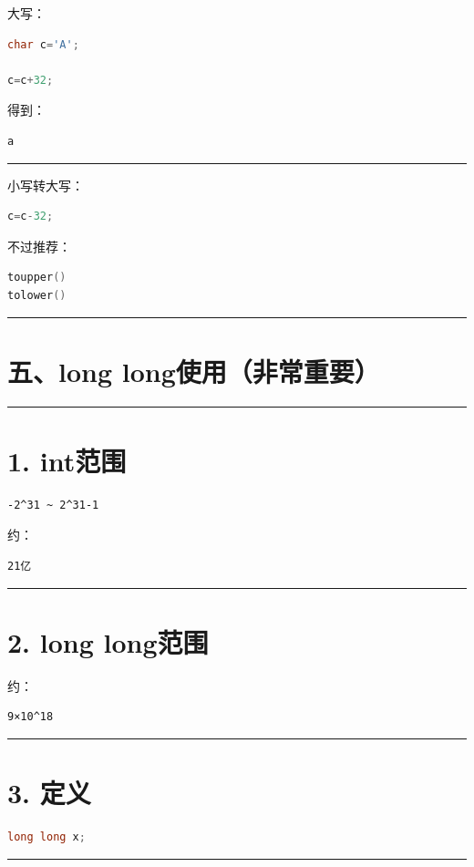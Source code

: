 \documentclass[9pt,twocolumn]{extarticle}
\begin{document}
大写：
\begin{lstlisting}[language=C++]
char c='A';

c=c+32;
\end{lstlisting}
得到：
\begin{lstlisting}
a
\end{lstlisting}

\noindent\rule{\linewidth}{0.4pt}

小写转大写：
\begin{lstlisting}[language=C++]
c=c-32;
\end{lstlisting}
不过推荐：
\begin{lstlisting}[language=C++]
toupper()
tolower()
\end{lstlisting}

\noindent\rule{\linewidth}{0.4pt}

\section{五、long long使用（非常重要）}

\noindent\rule{\linewidth}{0.4pt}

\section{1. int范围}
\begin{lstlisting}
-2^31 ~ 2^31-1
\end{lstlisting}
约：
\begin{lstlisting}
21亿
\end{lstlisting}

\noindent\rule{\linewidth}{0.4pt}

\section{2. long long范围}
约：
\begin{lstlisting}
9×10^18
\end{lstlisting}

\noindent\rule{\linewidth}{0.4pt}

\section{3. 定义}
\begin{lstlisting}[language=C++]
long long x;
\end{lstlisting}

\noindent\rule{\linewidth}{0.4pt}
\end{document}
